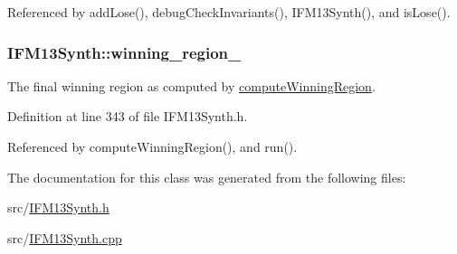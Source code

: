 Referenced by add\-Lose(), debug\-Check\-Invariants(), I\-F\-M13\-Synth(), and is\-Lose().

\hypertarget{classIFM13Synth_a9b05f84db78c1ac1a2a8f74212f66c64}{
\subsubsection[{winning\-\_\-region\-\_\-}]{ I\-F\-M13\-Synth\-::winning\-\_\-region\-\_\-\hspace{0.3cm}{\ttfamily [protected]}}}\label{classIFM13Synth_a9b05f84db78c1ac1a2a8f74212f66c64}


The final winning region as computed by \hyperlink{classIFM13Synth_a51c6831265e1daf7d0120c0dd954a0c4}{compute\-Winning\-Region}. 



Definition at line 343 of file I\-F\-M13\-Synth.\-h.



Referenced by compute\-Winning\-Region(), and run().



The documentation for this class was generated from the following files\-:\begin{DoxyCompactItemize}
\item 
src/\hyperlink{IFM13Synth_8h}{I\-F\-M13\-Synth.\-h}\item 
src/\hyperlink{IFM13Synth_8cpp}{I\-F\-M13\-Synth.\-cpp}\end{DoxyCompactItemize}
